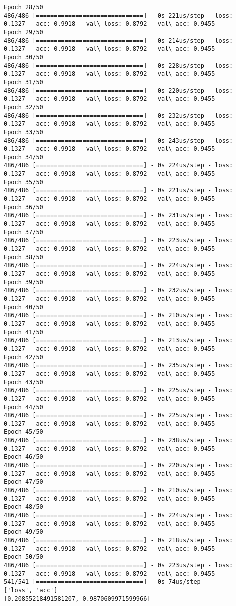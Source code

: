 \documentclass[11pt]{article}
\begin{document}
\begin{Verbatim}[commandchars=\\\{\}]
Epoch 28/50
486/486 [==============================] - 0s 221us/step - loss: 0.1327 - acc: 0.9918 - val\_loss: 0.8792 - val\_acc: 0.9455
Epoch 29/50
486/486 [==============================] - 0s 214us/step - loss: 0.1327 - acc: 0.9918 - val\_loss: 0.8792 - val\_acc: 0.9455
Epoch 30/50
486/486 [==============================] - 0s 228us/step - loss: 0.1327 - acc: 0.9918 - val\_loss: 0.8792 - val\_acc: 0.9455
Epoch 31/50
486/486 [==============================] - 0s 220us/step - loss: 0.1327 - acc: 0.9918 - val\_loss: 0.8792 - val\_acc: 0.9455
Epoch 32/50
486/486 [==============================] - 0s 232us/step - loss: 0.1327 - acc: 0.9918 - val\_loss: 0.8792 - val\_acc: 0.9455
Epoch 33/50
486/486 [==============================] - 0s 243us/step - loss: 0.1327 - acc: 0.9918 - val\_loss: 0.8792 - val\_acc: 0.9455
Epoch 34/50
486/486 [==============================] - 0s 224us/step - loss: 0.1327 - acc: 0.9918 - val\_loss: 0.8792 - val\_acc: 0.9455
Epoch 35/50
486/486 [==============================] - 0s 221us/step - loss: 0.1327 - acc: 0.9918 - val\_loss: 0.8792 - val\_acc: 0.9455
Epoch 36/50
486/486 [==============================] - 0s 231us/step - loss: 0.1327 - acc: 0.9918 - val\_loss: 0.8792 - val\_acc: 0.9455
Epoch 37/50
486/486 [==============================] - 0s 223us/step - loss: 0.1327 - acc: 0.9918 - val\_loss: 0.8792 - val\_acc: 0.9455
Epoch 38/50
486/486 [==============================] - 0s 224us/step - loss: 0.1327 - acc: 0.9918 - val\_loss: 0.8792 - val\_acc: 0.9455
Epoch 39/50
486/486 [==============================] - 0s 232us/step - loss: 0.1327 - acc: 0.9918 - val\_loss: 0.8792 - val\_acc: 0.9455
Epoch 40/50
486/486 [==============================] - 0s 210us/step - loss: 0.1327 - acc: 0.9918 - val\_loss: 0.8792 - val\_acc: 0.9455
Epoch 41/50
486/486 [==============================] - 0s 213us/step - loss: 0.1327 - acc: 0.9918 - val\_loss: 0.8792 - val\_acc: 0.9455
Epoch 42/50
486/486 [==============================] - 0s 235us/step - loss: 0.1327 - acc: 0.9918 - val\_loss: 0.8792 - val\_acc: 0.9455
Epoch 43/50
486/486 [==============================] - 0s 225us/step - loss: 0.1327 - acc: 0.9918 - val\_loss: 0.8792 - val\_acc: 0.9455
Epoch 44/50
486/486 [==============================] - 0s 225us/step - loss: 0.1327 - acc: 0.9918 - val\_loss: 0.8792 - val\_acc: 0.9455
Epoch 45/50
486/486 [==============================] - 0s 238us/step - loss: 0.1327 - acc: 0.9918 - val\_loss: 0.8792 - val\_acc: 0.9455
Epoch 46/50
486/486 [==============================] - 0s 220us/step - loss: 0.1327 - acc: 0.9918 - val\_loss: 0.8792 - val\_acc: 0.9455
Epoch 47/50
486/486 [==============================] - 0s 210us/step - loss: 0.1327 - acc: 0.9918 - val\_loss: 0.8792 - val\_acc: 0.9455
Epoch 48/50
486/486 [==============================] - 0s 224us/step - loss: 0.1327 - acc: 0.9918 - val\_loss: 0.8792 - val\_acc: 0.9455
Epoch 49/50
486/486 [==============================] - 0s 218us/step - loss: 0.1327 - acc: 0.9918 - val\_loss: 0.8792 - val\_acc: 0.9455
Epoch 50/50
486/486 [==============================] - 0s 223us/step - loss: 0.1327 - acc: 0.9918 - val\_loss: 0.8792 - val\_acc: 0.9455
541/541 [==============================] - 0s 74us/step
['loss', 'acc']
[0.20855218491581207, 0.9870609971599966]


\end{Verbatim}
\end{document}
